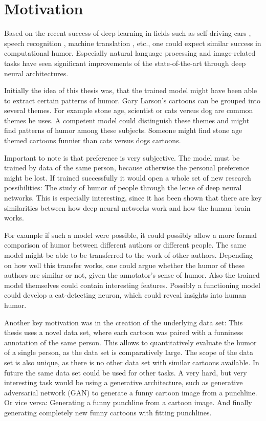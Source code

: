 \documentclass[draft,final,oneside]{vutinfth} %
\begin{document}
\section{Motivation}

Based on the recent success of deep learning in fields such as self-driving cars \cite{selfdriving}, speech recognition \cite{speech}, machine translation \cite{nmt}, etc., one could expect similar success in computational humor. Especially natural language processing and image-related tasks have seen significant improvements of the state-of-the-art through deep neural architectures.

Initially the idea of this thesis was, that the trained model might have been able to extract certain patterns of humor. Gary Larson's cartoons can be grouped into several themes. For example stone age, scientist or cats versus dog are common themes he uses. A competent model could distinguish these themes and might find patterns of humor among these subjects. Someone might find stone age themed cartoons funnier than cats versus dogs cartoons. 

Important to note is that preference is very subjective. The model must be trained by data of the same person, because otherwise the personal preference might be lost. If trained successfully it would open a whole set of new research possibilities: The study of humor of people through the lense of deep neural networks. This is especially interesting, since it has been shown that there are key similarities between how deep neural networks work and how the human brain works. \cite{Cichy2016}

For example if such a model were possible, it could possibly allow a more formal comparison of humor between different authors or different people.
The same model might be able to be transferred to the work of other authors. Depending on how well this transfer works, one could argue whether the humor of these authors are similar or not, given the annotator's sense of humor. Also the trained model themselves could contain interesting features. Possibly a functioning model could develop a cat-detecting neuron, which could reveal insights into human humor.

Another key motivation was in the creation of the underlying data set: This thesis uses a novel data set, where each cartoon was paired with a funniness annotation of the same person. This allows to quantitatively evaluate the humor of a single person, as the data set is comparatively large. The scope of the data set is also unique, as there is no other data set with similar cartoons available. In future the same data set could be used for other tasks. A very hard, but very interesting task would be using a generative architecture, such as generative adversarial network (GAN) to generate a funny cartoon image from a punchline. Or vice versa: Generating a funny punchline from a cartoon image. And finally generating completely new funny cartoons with fitting punchlines.\cite{gan2}\cite{gan}
\end{document}
